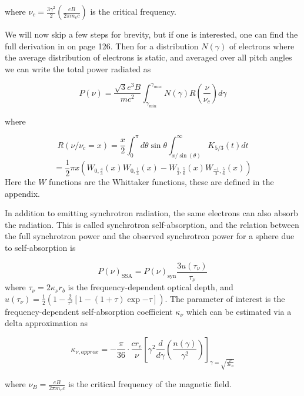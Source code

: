 where $\nu_c = \frac{3\gamma^2}{2}\left(\frac{eB}{2\pi m_e c}\right)$ is the critical frequency.

We will now skip a few steps for brevity, but if one is interested, one can find the full derivation in \cite{BHradiation} on page 126. Then for a distribution $N(\gamma)$ of electrons where the average distribution of electrons is static, and averaged over all pitch angles we can write the total power radiated as

\begin{equation}
    P(\nu) = \frac{\sqrt{3} e^3 B}{m c^2} \int_{\gamma_{min}}^{\gamma_{max}} N(\gamma) R\left(\frac{\nu}{\nu_c}\right)d\gamma
\end{equation}

where 

$$
R(\nu/\nu_c = x) =  \frac{x}{2} \int_0^\pi d\theta \sin\theta \int_{x/\sin(\theta)}^{\infty} K_{5/3}(t)dt
$$
\begin{equation}
    = \frac{1}{2}\pi x(W_{0,\frac{4}{3}}(x)W_{0,\frac{1}{3}}(x)-W_{\frac{1}{2},\frac{5}{6}}(x)W_{\frac{-1}{2},\frac{5}{6}}(x))
\end{equation}
Here the $W$ functions are the Whittaker functions, these are defined in the appendix. 

In addition to emitting synchrotron radiation, the same electrons can also absorb the radiation. This is called synchrotron self-absorption, and the relation between the full synchrotron power and the observed synchrotron power for a sphere due to self-absorption is

\begin{equation}
P(\nu)_{\text{SSA}} = P(\nu)_{\text{syn}}\frac{3 u(\tau_{\nu})}{\tau_{\nu}}
\end{equation}
where $\tau_{\nu} = 2 \kappa_{\nu} r_b$ is the frequency-dependent optical depth, and 
$u(\tau_{\nu}) = \frac{1}{2}\left(1- \frac{2}{\tau^2}[1-(1+\tau)\exp{-\tau}]\right)$. The parameter of interest is the frequency-dependent self-absorption coefficient $\kappa_{\nu}$ which can be estimated via a delta approximation as 

\begin{equation}
    \kappa_{\nu, approx} = -\frac{\pi}{36} \cdot \frac{c r_e}{\nu} \left[\gamma^2 \frac{d}{d\gamma}\left(\frac{n(\gamma)}{\gamma^2}\right) \right]_{\gamma = \sqrt{\frac{\nu}{2 \nu_B}}}
\end{equation}

where $\nu_B = \frac{e B}{2 \pi m_e c }$ is the critical frequency of the magnetic field.

